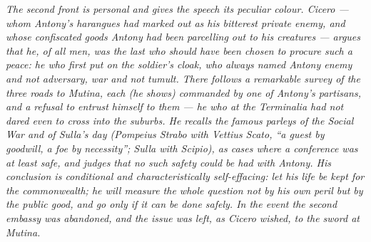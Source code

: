 \textit{The second front is personal and gives the speech its
peculiar colour. Cicero --- whom Antony's harangues had marked out as
his bitterest private enemy, and whose confiscated goods Antony had
been parcelling out to his creatures --- argues that he, of all men,
was the last who should have been chosen to procure such a peace: he
who first put on the soldier's cloak, who always named Antony enemy
and not adversary, war and not tumult. There follows a remarkable
survey of the three roads to Mutina, each (he shows) commanded by one
of Antony's partisans, and a refusal to entrust himself to them ---
he who at the Terminalia had not dared even to cross into the suburbs.
He recalls the famous parleys of the Social War and of Sulla's day
(Pompeius Strabo with Vettius Scato, ``a guest by goodwill, a foe by
necessity''; Sulla with Scipio), as cases where a conference was at
least safe, and judges that no such safety could be had with Antony.
His conclusion is conditional and characteristically self-effacing:
let his life be kept for the commonwealth; he will measure the whole
question not by his own peril but by the public good, and go only if
it can be done safely. In the event the second embassy was abandoned,
and the issue was left, as Cicero wished, to the sword at Mutina.}

